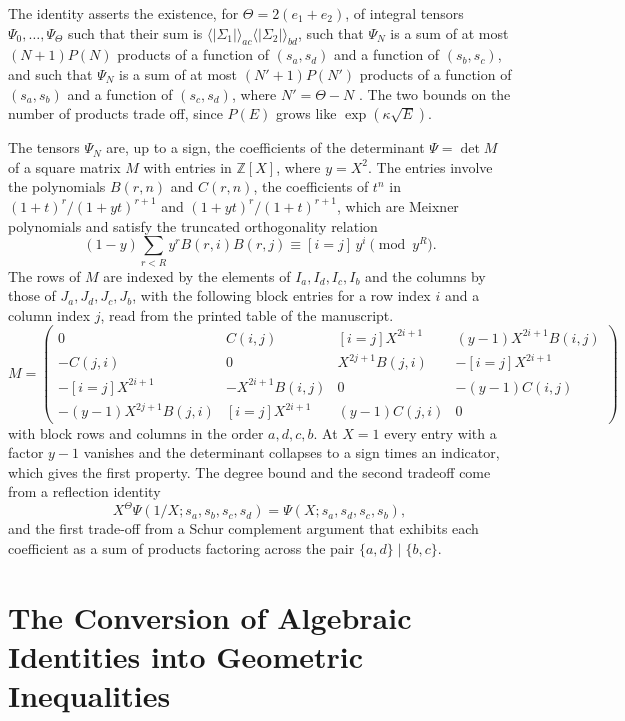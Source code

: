 \documentclass[11pt,letterpaper]{report}
\theoremstyle{plain}
\theoremstyle{definition}
\theoremstyle{remark}
\begin{document}
The identity asserts the existence, for $\Theta=2(e_1+e_2)$, of integral tensors $\Psi_0,\ldots,\Psi_\Theta$ such that their sum is $\langle|\Sigma_1|\rangle_{ac}\langle|\Sigma_2|\rangle_{bd}$, such that $\Psi_N$ is a sum of at most $(N+1)P(N)$ products of a function of $(s_a,s_d)$ and a function of $(s_b,s_c)$, and such that $\Psi_N$ is a sum of at most $(N'+1)P(N')$ products of a function of $(s_a,s_b)$ and a function of $(s_c,s_d)$, where $N'=\Theta-N$ \cite{Source2026}. The two bounds on the number of products trade off, since $P(E)$ grows like $\exp(\kappa\sqrt E)$.

The tensors $\Psi_N$ are, up to a sign, the coefficients of the determinant $\Psi=\det M$ of a square matrix $M$ with entries in $\mathbb Z[X]$, where $y=X^2$. The entries involve the polynomials $B(r,n)$ and $C(r,n)$, the coefficients of $t^n$ in $(1+t)^r/(1+yt)^{r+1}$ and $(1+yt)^r/(1+t)^{r+1}$, which are Meixner polynomials and satisfy the truncated orthogonality relation
\[
(1-y)\sum_{r<R}y^{r}B(r,i)B(r,j)\equiv[i=j]\,y^{i}\pmod{y^{R}}.
\]
The rows of $M$ are indexed by the elements of $I_a,I_d,I_c,I_b$ and the columns by those of $J_a,J_d,J_c,J_b$, with the following block entries for a row index $i$ and a column index $j$, read from the printed table of the manuscript.
\[
M=\begin{pmatrix}
0 & C(i,j) & [i{=}j]X^{2i+1} & (y{-}1)X^{2i+1}B(i,j)\\
-C(j,i) & 0 & X^{2j+1}B(j,i) & -[i{=}j]X^{2i+1}\\
-[i{=}j]X^{2i+1} & -X^{2i+1}B(i,j) & 0 & -(y{-}1)C(i,j)\\
-(y{-}1)X^{2j+1}B(j,i) & [i{=}j]X^{2i+1} & (y{-}1)C(j,i) & 0
\end{pmatrix}
\]
with block rows and columns in the order $a,d,c,b$. At $X=1$ every entry with a factor $y-1$ vanishes and the determinant collapses to a sign times an indicator, which gives the first property. The degree bound and the second tradeoff come from a reflection identity
\[
X^{\Theta}\Psi(1/X;s_a,s_b,s_c,s_d)=\Psi(X;s_a,s_d,s_c,s_b),
\]
and the first trade-off from a Schur complement argument that exhibits each coefficient as a sum of products factoring across the pair $\{a,d\}\mid\{b,c\}$.

\section{The Conversion of Algebraic Identities into Geometric Inequalities}
\end{document}
